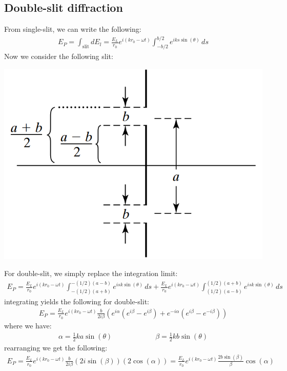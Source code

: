 \documentclass[11pt]{book}
\theoremstyle{break}
\theoremstyle{break}
\begin{document}
\subsection{Double-slit diffraction}
From single-slit, we can write the following:
\begin{align*}
E_P = \int_{\text{slit}} dE_l
 = \frac{E_L}{r_0}e^{i(kr_0 -\omega t)}\int_{-b/2}^{b/2}e^{iks \sin(\theta)}\, ds
\end{align*}
Now we consider the following slit:
\begin{center}
\includegraphics[scale=0.45]{doubleSlitDiff}
\end{center}
For double-slit, we simply replace the integration limit:
\begin{align*}
E_P = \frac{E_L}{r_0}e^{i(kr_0-\omega t)}\int_{-(1/2)(a+b)}^{-(1/2)(a-b)}e^{isk \sin(\theta)} \, ds + \frac{E_L}{r_0}e^{i(kr_0 -\omega t)}\int_{(1/2)(a-b)}^{(1/2)(a+b)}e^{isk\sin(\theta)}\, ds
\end{align*}
integrating yields the following for double-slit:
\begin{align*}
E_P = \frac{E_L}{r_0}e^{i(kr_0-\omega t)}\frac{b}{2i\beta}\left( e^{i\alpha}(e^{i\beta} - e^{i\beta}) + e^{-i\alpha}(e^{i\beta} - e^{-i\beta}) \right)
\end{align*}
where we have:
\begin{align*}
\alpha = \frac{1}{2}ka\sin(\theta) \qquad\qquad\qquad \beta = \frac{1}{2}kb \sin(\theta)
\end{align*}
rearranging we get the following:
\begin{align*}
E_P = \frac{E_L}{r_0}e^{i(kr_0 -\omega t)}\frac{b}{2i\beta}(2i\sin(\beta))(2\cos(\alpha)) = \frac{E_L}{r_0}e^{i(kr_0-\omega t)}\frac{2b\sin(\beta)}{\beta} \cos(\alpha)
\end{align*}
\end{document}
